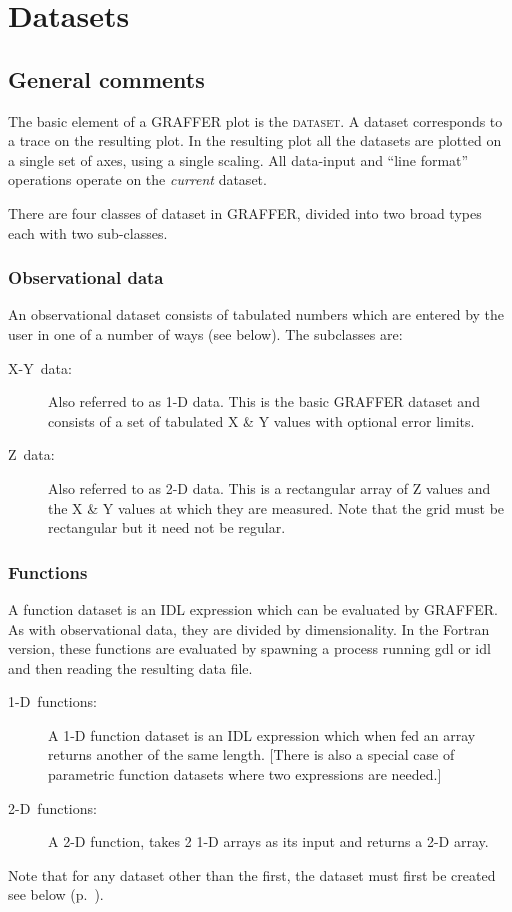 \documentclass[11pt,twoside,english]{article}
\begin{document}
\section{Datasets}


\subsection{General comments}

The basic element of a GRAFFER plot is the \textsc{dataset}. A dataset
corresponds to a trace on the resulting plot. In the resulting plot all
the datasets are plotted on a single set of axes, using a single
scaling. All data-input and {}``line format'' operations operate on the
\textit{current} dataset.

There are four classes of dataset in GRAFFER, divided into two broad
types each with two sub-classes.


\subsubsection{Observational data }

An observational dataset consists of tabulated numbers which are
entered by the user in one of a number of ways (see below). The
subclasses are:

\begin{description}
\item [X-Y~data:]Also referred to as 1-D data. This is the basic
  GRAFFER dataset and consists of a set of tabulated X \& Y values with
  optional error limits.
\item [Z~data:]Also referred to as 2-D data. This is a rectangular
  array of Z values and the X \& Y values at which they are
  measured. Note that the grid must be rectangular but it need not be
  regular.
\end{description}

\subsubsection{Functions }

A function dataset is an IDL expression which can be evaluated by
GRAFFER. As with observational data, they are divided by
dimensionality. In the Fortran version, these functions are evaluated
by spawning a process running gdl or idl and then reading the resulting
data file.

\begin{description}
\item [1-D~functions:]A 1-D function dataset is an IDL expression which
  when fed an array returns another of the same length. {[}There is
  also a special case of parametric function datasets where two
  expressions are needed.{]}
\item [2-D~functions:]A 2-D function, takes 2 1-D arrays as its input
  and returns a 2-D array.
\end{description}
Note that for any dataset other than the first, the dataset must first
be created see below (p.~\pageref{make-new-ds}).
\end{document}
